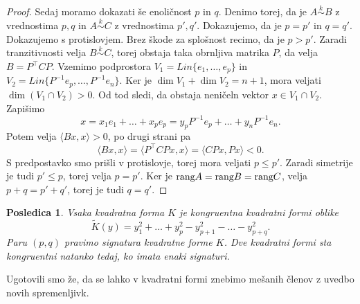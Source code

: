 \documentclass[10pt, a4paper]{article}
\newtheorem{posledica}[izr]{Posledica}
\newenvironment{noticeC}{%
  \tcolorbox[%
  notitle,
  empty,
  enhanced,  %
  breakable,
  coltext=black, 
  fontupper=\rmfamily,
  parbox=false,
  noparskip,
  sharp corners,
  boxrule=-1pt,  %
  frame hidden,
  left=7pt,  %
  right=7pt,
  top=5pt,
  bottom=5pt,
  before skip=2.5ex plus 2pt,
  after skip=2.5ex plus 2pt,
  overlay unbroken and last={%
  },
  ]}
{\endtcolorbox}
\newenvironment{dokaz}%
  {\begin{noticeC}\begin{proof}}%
  {\end{proof}\end{noticeC}}
\newcommand{\rang}{\textup{\text{rang}}}
\newcommand{\sprod}[2]{\langle {#1},{#2} \rangle}
\begin{document}
\begin{dokaz}
    Sedaj moramo dokazati še enoličnost $p$ in $q$. 
    Denimo torej, da je $A \stackrel{k}{\sim} B$ z vrednostima $p, q$ in 
    $A \stackrel{k}{\sim} C$ z vrednostima $p', q'$. Dokazujemo, da je $p = p'$ in $q = q'$. 
    Dokazujemo s protislovjem. Brez škode za splošnost recimo, da je $p > p'.$
    Zaradi tranzitivnosti velja $B \stackrel{k}{\sim} C$, torej obstaja taka obrnljiva matrika $P$,
    da velja $B = P^\top CP$.
    Vzemimo podprostora $V_1 = Lin \{e_1, \dots, e_p\}$ in $V_2 = Lin \{P^{-1} e_p, \dots, P^{-1} e_{n}\}$.
    Ker je $\dim V_1 + \dim V_2 = n + 1$, mora veljati $\dim (V_1 \cap V_2) > 0$.
    Od tod sledi, da obstaja neničeln vektor $x \in V_1 \cap V_2$.
    Zapišimo \begin{equation*}
        x = x_1 e_1 + \dots + x_p e_p = y_p P^{-1} e_p + \dots + y_{n} P^{-1} e_n.
    \end{equation*}
    Potem velja $\sprod{Bx}{x} > 0$, po drugi strani pa 
    $$\sprod{Bx}{x} = \sprod{P^\top C P x}{x} = \sprod{C Px}{Px} < 0.$$
    S predpostavko smo prišli v protislovje, torej mora veljati $p \leq p'.$
    Zaradi simetrije je tudi $p'\leq p$, torej velja $p = p'.$
    Ker je $\rang A = \rang B = \rang C$, velja $p + q = p' + q'$, torej je tudi $q = q'.$ 
\end{dokaz}

\begin{posledica}
    Vsaka kvadratna forma $K$ je kongruentna kvadratni formi oblike
    $$\widetilde{K}(y) = y_1 ^2 + \dots + y_p^2 - y_{p+1}^2 - \dots - y_{p+q}^2.$$
    Paru $(p, q)$ pravimo signatura kvadratne forme $K$. Dve kvadratni formi sta kongruentni natanko tedaj, ko imata enaki signaturi.
\end{posledica}

Ugotovili smo že, da se lahko v kvadratni formi znebimo mešanih členov z uvedbo novih spremenljivk.
\end{document}
